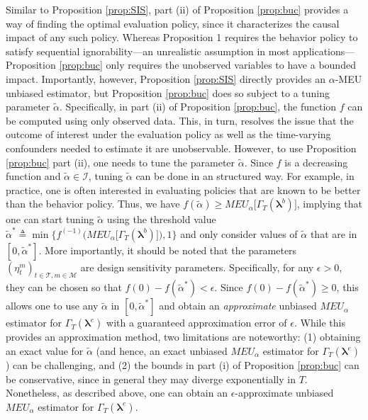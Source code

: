 \documentclass[opre,nonblindrev]{informs2}%
\newcommand{\teq}{\triangleq}
\newcommand{\1}{\hbox{\rm 1\kern-.35em 1}}
\newcommand{\MT}{\mathscr T}
\newcommand{\MI}{\mathscr I}
\newcommand{\MM}{\mathscr M}
\newcommand{\blambda}{\boldsymbol{\lambda}}
\begin{document}
Similar to Proposition  \ref{prop:SIS}, part (ii) of Proposition  \ref{prop:buc} provides a way of finding the optimal evaluation policy, since it characterizes the causal impact of any such policy.  Whereas Proposition 1 requires the behavior policy to satisfy sequential ignorability---an
unrealistic assumption in most applications---Proposition \ref{prop:buc} only requires the unobserved variables
to have a bounded impact. Importantly, however, Proposition \ref{prop:SIS} directly provides an $\alpha$-MEU unbiased estimator, but  Proposition \ref{prop:buc} does so subject  to a tuning parameter $\tilde\alpha$. Specifically, in part (ii) of Proposition \ref{prop:buc}, the function $f$ can be computed using only observed data. This, in turn, resolves the issue that the outcome of interest under the evaluation policy as well as the time-varying confounders needed to estimate it are unobservable. However, to use Proposition \ref{prop:buc} part (ii), one needs to tune the parameter $\tilde\alpha$. Since $f$ is a decreasing function and $\tilde\alpha\in\MI$, tuning  $\tilde\alpha$ can be done in an structured way.  For example, in practice, one is often  interested in evaluating policies that are known to be better than the behavior policy. Thus, we  have $f (\tilde\alpha)\geq MEU_\alpha\big[\Gamma_T(\blambda^b)\big]$, implying that one can start tuning $\tilde\alpha$ using the  threshold value $\tilde\alpha^*\teq \min\bigg\{f^{(-1)} \Big(MEU_\alpha\big[\Gamma_T(\blambda^b)\big]\Big), 1\bigg\}$ and only consider values of $\tilde\alpha$ that are in $[0,\tilde\alpha^*]$. More importantly, it should be noted that the parameters $(\eta_t^m)_{t\in\MT,m\in\MM}$ are design sensitivity parameters. Specifically, for any $\epsilon>0$, they can be chosen so that $f(0)-f(\tilde\alpha^*)<\epsilon$. Since $f(0)-f(\tilde\alpha^*)\geq 0$, this allows one to use any $\tilde\alpha$ in $[0,\tilde\alpha^*]$ and obtain an {\em approximate} unbiased $MEU_\alpha$ estimator for $\Gamma_T(\blambda^e)$ with a guaranteed approximation error of $\epsilon$. While this provides an approximation method, two limitations are noteworthy: (1) obtaining an exact value for  $\tilde\alpha$ (and hence, an exact unbiased $MEU_\alpha$ estimator for $\Gamma_T(\blambda^e)$) can be challenging, and (2)  the bounds in part (i) of Proposition  \ref{prop:buc} can be conservative, since in general they may diverge exponentially in $T$. Nonetheless, as described above, one can obtain an  $\epsilon$-approximate unbiased $MEU_\alpha$ estimator for $\Gamma_T(\blambda^e)$.
\end{document}
